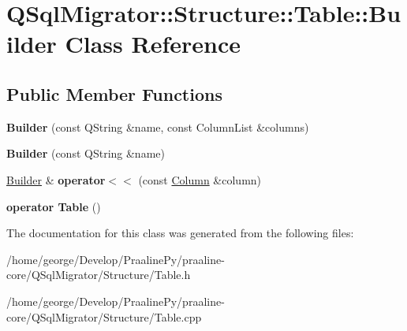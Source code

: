 \hypertarget{class_q_sql_migrator_1_1_structure_1_1_table_1_1_builder}{}\section{Q\+Sql\+Migrator\+:\+:Structure\+:\+:Table\+:\+:Builder Class Reference}
\label{class_q_sql_migrator_1_1_structure_1_1_table_1_1_builder}
\subsection*{Public Member Functions}
\begin{DoxyCompactItemize}
\item 
\mbox{\label{class_q_sql_migrator_1_1_structure_1_1_table_1_1_builder_a39eac2b75ff6a49ee98de58e89fdde18}} 
{\bfseries Builder} (const Q\+String \&name, const Column\+List \&columns)
\item 
\mbox{\label{class_q_sql_migrator_1_1_structure_1_1_table_1_1_builder_ab83907e8f11875c5109cff0faa71e57a}} 
{\bfseries Builder} (const Q\+String \&name)
\item 
\mbox{\label{class_q_sql_migrator_1_1_structure_1_1_table_1_1_builder_a036741faad713fb6c88984682ea2f42f}} 
\hyperlink{class_q_sql_migrator_1_1_structure_1_1_table_1_1_builder}{Builder} \& {\bfseries operator$<$$<$} (const \hyperlink{class_q_sql_migrator_1_1_structure_1_1_column}{Column} \&column)
\item 
\mbox{\label{class_q_sql_migrator_1_1_structure_1_1_table_1_1_builder_a25d424810dc95bf775961c129dd6a15a}} 
{\bfseries operator Table} ()
\end{DoxyCompactItemize}


The documentation for this class was generated from the following files\+:\begin{DoxyCompactItemize}
\item 
/home/george/\+Develop/\+Praaline\+Py/praaline-\/core/\+Q\+Sql\+Migrator/\+Structure/Table.\+h\item 
/home/george/\+Develop/\+Praaline\+Py/praaline-\/core/\+Q\+Sql\+Migrator/\+Structure/Table.\+cpp\end{DoxyCompactItemize}
